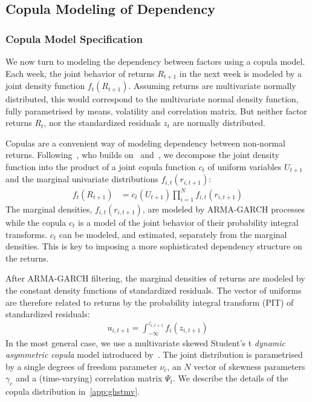 
\subsection{Copula Modeling of Dependency} %
\label{sub:05_04_copula}

\subsubsection{Copula Model Specification}

We now turn to modeling the dependency between factors using a copula model. 
Each week, the joint behavior of returns $R_{t+1}$ in the next week is modeled by a joint density function $f_t(R_{t+1})$. Assuming returns are multivariate normally distributed, this would correspond to the multivariate normal density function, fully parametrised by means, volatility and correlation matrix. But neither factor returns $R_t$, nor the standardized residuals $z_t$ are normally distributed.

Copulas are a convenient way of modeling dependency between non-normal returns. Following~\textcite{ChristoffersenErrunzaJacobLanglois2012}, who builds on~\textcite{Patton2006} and~\textcite{Sklar1959}, we decompose the joint density function into the product of a joint copula function $c_t$ of uniform variables $U_{t+1}$ and the marginal univariate distributions $f_{i,t}(r_{i, t+1})$:
\begin{align}
  f_t(R_{t+1}) &=
    c_t(U_{t+1}) \prod^N_{i = 1} f_{i,t}(r_{i, t + 1})
\end{align}
The marginal densities, $f_{i,t}(r_{i, t + 1})$, are modeled by ARMA-GARCH processes while the copula $c_t$ is a model of the joint behavior of their probability integral transforms. $c_t$ can be modeled, and estimated, separately from the marginal densities. This is key to imposing a more sophisticated dependency structure on the returns.

After ARMA-GARCH filtering, the marginal densities of returns are modeled by the constant density functions of standardized residuals. The vector of uniforms are therefore related to returns by the probability integral transform (PIT) of standardized residuals:
\begin{align}
  u_{i, t+1} = \int_{-\infty}^{z_{i,t+1}} f_{i}(z_{i,t+1})
\end{align}
In the most general case, we use a multivariate skewed Student's t \emph{dynamic asymmetric copula} model introduced by~\textcite{ChristoffersenErrunzaJacobLanglois2012}. The joint distribution is parametrised by a single degrees of freedom parameter $\nu_c$, an $N$ vector of skewness parameters $\gamma_{c}$ and a (time-varying) correlation matrix $\Psi_{t}$. We describe the details of the copula distribution in~\autoref{app:ghstmv}.

